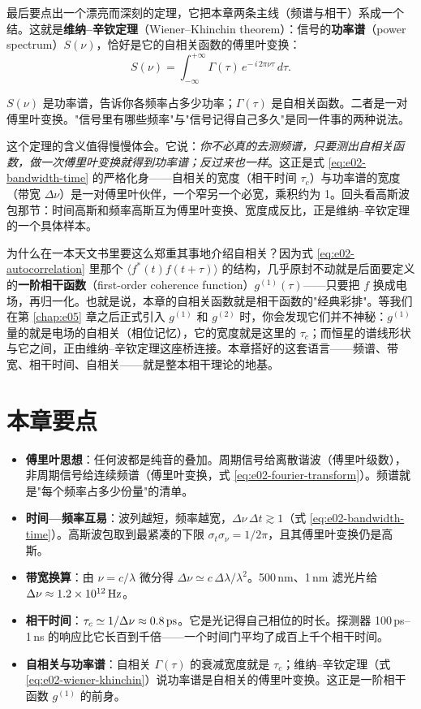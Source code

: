 最后要点出一个漂亮而深刻的定理，它把本章两条主线（频谱与相干）系成一个结。这就是\textbf{维纳–辛钦定理}（Wiener–Khinchin theorem）：信号的\textbf{功率谱}（power spectrum）\(S(\nu)\)，恰好是它的自相关函数的傅里叶变换：
\begin{equation}
  S(\nu)=\int_{-\infty}^{+\infty}\Gamma(\tau)\,e^{-\,i\,2\pi\nu\tau}\,d\tau .
  \label{eq:e02-wiener-khinchin}
\end{equation}
\begin{formulaexplain}
\(S(\nu)\) 是功率谱，告诉你各频率占多少功率；\(\Gamma(\tau)\) 是自相关函数。二者是一对傅里叶变换。"信号里有哪些频率"与"信号记得自己多久"是同一件事的两种说法。
\end{formulaexplain}
这个定理的含义值得慢慢体会。它说：\emph{你不必真的去测频谱，只要测出自相关函数，做一次傅里叶变换就得到功率谱；反过来也一样}。这正是式 \eqref{eq:e02-bandwidth-time} 的严格化身——自相关的宽度（相干时间 \(\tau_c\)）与功率谱的宽度（带宽 \(\Delta\nu\)）是一对傅里叶伙伴，一个窄另一个必宽，乘积约为 1。回头看高斯波包那节：时间高斯和频率高斯互为傅里叶变换、宽度成反比，正是维纳–辛钦定理的一个具体样本。

为什么在一本天文书里要这么郑重其事地介绍自相关？因为式 \eqref{eq:e02-autocorrelation} 里那个 \(\langle f^*(t)f(t+\tau)\rangle\) 的结构，几乎原封不动就是后面要定义的\textbf{一阶相干函数}（first-order coherence function）\(g^{(1)}(\tau)\)——只要把 \(f\) 换成电场，再归一化。也就是说，本章的自相关函数就是相干函数的"经典彩排"。等我们在第 \ref{chap:e05} 章之后正式引入 \(g^{(1)}\) 和 \(g^{(2)}\) 时，你会发现它们并不神秘：\(g^{(1)}\) 量的就是电场的自相关（相位记忆），它的宽度就是这里的 \(\tau_c\)；而恒星的谱线形状与它之间，正由维纳–辛钦定理这座桥连接。本章搭好的这套语言——频谱、带宽、相干时间、自相关——就是整本相干理论的地基。

\section{本章要点}
\label{sec:e02-summary}

\begin{itemize}
  \item \textbf{傅里叶思想}：任何波都是纯音的叠加。周期信号给离散谐波（傅里叶级数），非周期信号给连续频谱（傅里叶变换，式 \eqref{eq:e02-fourier-transform}）。频谱就是"每个频率占多少份量"的清单。
  \item \textbf{时间—频率互易}：波列越短，频率越宽，\(\Delta\nu\,\Delta t\gtrsim1\)（式 \eqref{eq:e02-bandwidth-time}）。高斯波包取到最紧凑的下限 \(\sigma_t\sigma_\nu=1/2\pi\)，且其傅里叶变换仍是高斯。
  \item \textbf{带宽换算}：由 \(\nu=c/\lambda\) 微分得 \(\Delta\nu\simeq c\,\Delta\lambda/\lambda^{2}\)。500\,nm、1\,nm 滤光片给 \(\Delta\nu\approx1.2\times10^{12}\,{\rm Hz}\)。
  \item \textbf{相干时间}：\(\tau_c\simeq1/\Delta\nu\approx0.8\,{\rm ps}\)。它是光记得自己相位的时长。探测器 100\,ps--1\,ns 的响应比它长百到千倍——一个时间门平均了成百上千个相干时间。
  \item \textbf{自相关与功率谱}：自相关 \(\Gamma(\tau)\) 的衰减宽度就是 \(\tau_c\)；维纳–辛钦定理（式 \eqref{eq:e02-wiener-khinchin}）说功率谱是自相关的傅里叶变换。这正是一阶相干函数 \(g^{(1)}\) 的前身。
\end{itemize}

